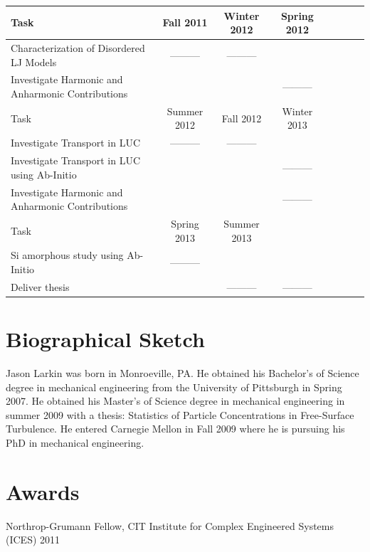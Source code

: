 \documentclass[letterpaper,12pt]{article}
\begin{document}
\begin{tabular}{l*{6}{c}r}
Task              				& Fall 2011 & Winter 2012 & Spring 2012  \\
\hline
Characterization of Disordered LJ Models 	& --------- & --------- &  \\
Investigate Harmonic and Anharmonic Contributions	&  &  & --------- \\
\hline
Task  							& Summer 2012 & Fall 2012  & Winter 2013 \\
\hline
Investigate Transport in LUC 	& --------- & ---------   &  \\
Investigate Transport in LUC using Ab-Initio	& & & --------- \\
Investigate Harmonic and Anharmonic Contributions & & & --------- \\
\hline
Task  							& Spring 2013 & Summer 2013 & \\
\hline
Si amorphous study using Ab-Initio  & --------- & & \\	
Deliver thesis					& & --------- & --------- \\						
\end{tabular}

\vspace{1cm}


\clearpage

\section{Biographical Sketch} 
Jason Larkin was born in Monroeville, PA.  He obtained his Bachelor's of Science degree
in mechanical engineering from the University of Pittsburgh in
Spring 2007. He obtained his Master's of Science degree in mechanical engineering in summer 2009 with a thesis: Statistics of Particle Concentrations in Free-Surface Turbulence. He entered Carnegie Mellon in Fall 2009 where he is pursuing his PhD in mechanical engineering.

\section*{\label{S-awards}Awards}

Northrop-Grumann Fellow, CIT Institute for Complex Engineered Systems (ICES) 2011
\end{document}
